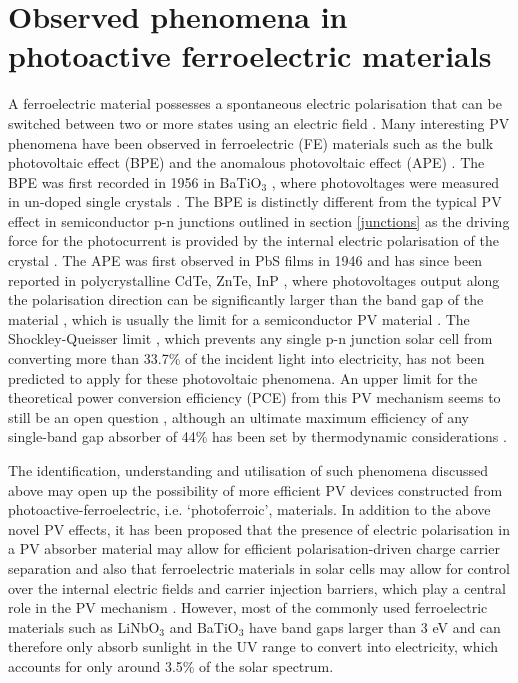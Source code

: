 \documentclass[11pt, twoside]{report}
\begin{document}
\section{Observed phenomena in photoactive ferroelectric materials}\label{ferroPVsection}
A ferroelectric material possesses a spontaneous electric polarisation that can be switched between two or more states using an electric field \cite{new_FE_PV_1}. Many interesting PV phenomena have been observed in ferroelectric (FE) materials such as the bulk photovoltaic effect (BPE) and the anomalous photovoltaic effect (APE) \cite{keith}. 
The BPE was first recorded in 1956 in BaTiO$_3$ \cite{keith_46}, where photovoltages were measured in un-doped single crystals \cite{keith}.
The BPE is distinctly different from the typical PV effect in semiconductor
p-n junctions outlined in section \ref{junctions} as the driving force for the photocurrent is provided by the internal electric polarisation of the crystal \cite{FE_PV_rev1}. 
The APE was first observed in PbS films in 1946 \cite{keith_54} and has since been reported in polycrystalline CdTe, ZnTe, InP \cite{keith_55, keith_56, keith_57}, where photovoltages output along the polarisation direction can be significantly larger than the band gap of the material \cite{FE_PV_rev1}, which is usually the limit for a semiconductor PV material \cite{keith}. 
The Shockley-Queisser limit \cite{SQ_1961}, which prevents any single p-n junction solar cell from converting more than 33.7\% of the incident light into electricity, has not been predicted to apply for these photovoltaic phenomena. An upper limit for the theoretical power conversion efficiency (PCE) from this PV mechanism seems to still be an open question \cite{ FE-PV_kirchartz, new_FE_PV}, although an ultimate maximum efficiency of any single-band gap absorber of 44\% has been set by thermodynamic considerations \cite{SQ_1961}. 

The identification, understanding and utilisation of such phenomena discussed above may open up the possibility of more efficient PV devices constructed from photoactive-ferroelectric, i.e. `photoferroic', materials.
In addition to the above novel PV effects, it has been proposed that the presence of electric polarisation in a PV absorber material may allow for efficient polarisation-driven charge carrier separation \cite{Jarv, FE-PV_lett} and also that ferroelectric materials in solar cells may allow for control over the internal electric fields and carrier injection barriers, which play a central role in the PV mechanism \cite{FE-PV_kirchartz}.
However, most of the commonly used ferroelectric materials such as LiNbO$_3$ and BaTiO$_3$ have band gaps larger than 3 eV and can therefore only absorb sunlight in the UV range to convert into electricity, which accounts for only around 3.5\% of the solar spectrum. 
\end{document}
